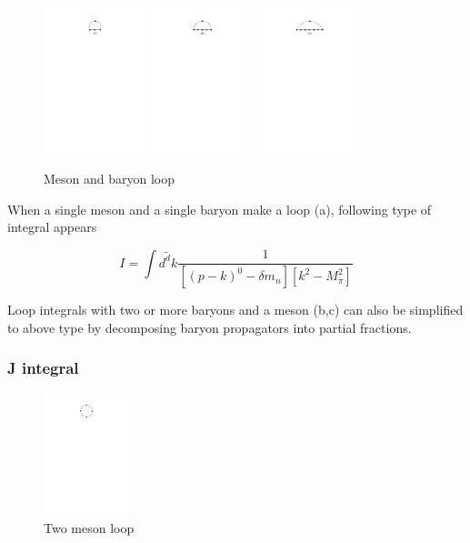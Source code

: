 \documentclass{article}
\newcommand{\beq}{\begin{equation}}
\newcommand{\eeq}{\end{equation}}
\begin{document}
\begin{figure}[h]
	\caption{Meson and baryon loop}
	\includegraphics[trim={7cm 24cm 7cm 2cm}, clip=true,width=  3cm]{images/types of loops/meson_baryon_e.pdf}
	\includegraphics[trim={7cm 24cm 7cm 2cm}, clip=true,width=  3cm]{images/types of loops/meson_2baryon_e.pdf}
	\includegraphics[trim={7cm 24cm 7cm 2cm}, clip=true,width=  3cm]{images/types of loops/meson_3baryon_e.pdf}
	\centering
\end{figure}

When a single meson and a single baryon make a loop (a), following type of integral appears

\beq
I = \int \tilde{d^dk} \frac{   {1}    }{ \left[ \left(p-k\right)^0 -\delta m_n \right] \left[k^2-M_\pi^2 \right] } 
\eeq   

Loop integrals with two or more baryons and a meson (b,c) can also be simplified to above type by decomposing baryon propagators into partial fractions.

\subsubsection{J integral}

\begin{figure}[h]
	\caption{Two meson loop}
	\includegraphics[trim={8cm 23.5cm 8cm 2cm}, clip=true,width=  2.5cm]{images/types of loops/2meson.pdf}
	\centering
\end{figure}
\end{document}
